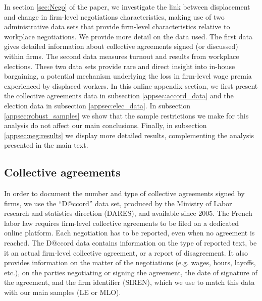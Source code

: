 
In section \ref{sec:Nego} of the paper, we investigate the link between displacement and change in firm-level negotiations characteristics, making use of two administrative data sets that provide firm-level characteristics relative to workplace negotiations. We provide more detail on the data used. The first data gives detailed information about collective agreements signed (or discussed) within firms. The second data measures turnout and results from workplace elections. These two data sets provide rare and direct insight into in-house bargaining, a potential mechanism underlying the loss in firm-level wage premia experienced by displaced workers. In this online appendix section, we first present the collective agreements data in subsection \ref{appsec:accord_data} and the election data in subsection \ref{appsec:elec_data}. In subsection \ref{appsec:robust_samples} we show that the sample restrictions we make for this analysis do not affect our main conclusions. Finally, in subsection \ref{appsec:neg:results} we display more detailed results, complementing the analysis presented in the main text. 

\subsection{Collective agreements\label{appsec:accord_data}}


In order to document the number and type of collective agreements signed by firms, we use the ``D@ccord'' data set, produced by the Ministry of Labor research and statistics direction (DARES), and available since 2005. The French labor law requires firm-level collective agreements to be filed on a dedicated online platform. Each negotiation has to be reported, even when no agreement is reached. The D@ccord data contains information on the type of reported text, be it an actual firm-level collective agreement, or a report of disagreement. It also provides information on the matter of the negotiations (e.g. wages, hours, layoffs, etc.), on the parties negotiating or signing the agreement, the date of signature of the agreement, and the firm identifier (SIREN), which we use to match this data with our main samples (LE or MLO).

